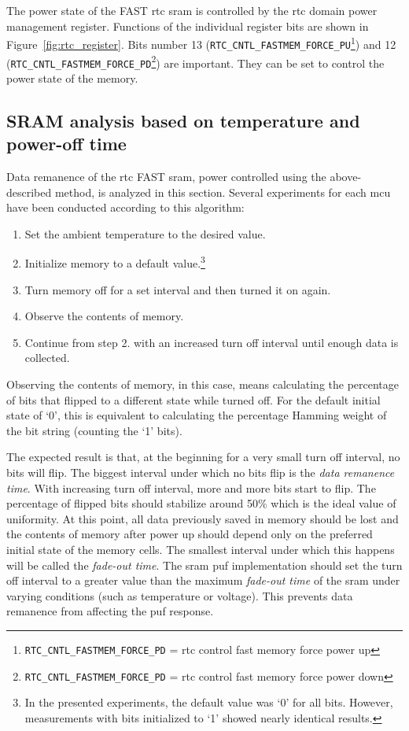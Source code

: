 The power state of the FAST \gls{rtc} \gls{sram} is controlled by the \gls{rtc} domain power management register. Functions of the individual register bits are shown in Figure~\ref{fig:rtc_register}. Bits number 13 (\lstinline{RTC_CNTL_FASTMEM_FORCE_PU}\footnote{\lstinline{RTC_CNTL_FASTMEM_FORCE_PD} = \gls{rtc} control fast memory force power up}) and 12 (\lstinline{RTC_CNTL_FASTMEM_FORCE_PD}\footnote{\lstinline{RTC_CNTL_FASTMEM_FORCE_PD} = \gls{rtc} control fast memory force power down}) are important. They can be set to control the power state of the memory.~\cite{esp322021}

\subsection{SRAM analysis based on temperature and power-off time}\label{sec:rtc_analysis}

Data remanence of the \gls{rtc} FAST \gls{sram}, power controlled using the above-described method, is analyzed in this section. Several experiments for each \gls{mcu} have been conducted according to this algorithm:

\begin{enumerate}
    \item Set the ambient temperature to the desired value.
    \item Initialize memory to a default value.\footnote{In the presented experiments, the default value was `0' for all bits. However, measurements with bits initialized to `1' showed nearly identical results.}
    \item Turn memory off for a set interval and then turned it on again.
    \item Observe the contents of memory.
    \item Continue from step 2. with an increased turn off interval until enough data is collected.
\end{enumerate}

Observing the contents of memory, in this case, means calculating the percentage of bits that flipped to a different state while turned off. For the default initial state of `0', this is equivalent to calculating the percentage Hamming weight of the bit string (counting the `1' bits).

The expected result is that, at the beginning for a very small turn off interval, no bits will flip. The biggest interval under which no bits flip is the \emph{data remanence time}. With increasing turn off interval, more and more bits start to flip. The percentage of flipped bits should stabilize around 50\% which is the ideal value of uniformity. At this point, all data previously saved in memory should be lost and the contents of memory after power up should depend only on the preferred initial state of the memory cells. The smallest interval under which this happens will be called the \emph{fade-out time}. The \gls{sram} \gls{puf} implementation should set the turn off interval to a greater value than the maximum \emph{fade-out time} of the \gls{sram} under varying conditions (such as temperature or voltage). This prevents data remanence from affecting the \gls{puf} response.


